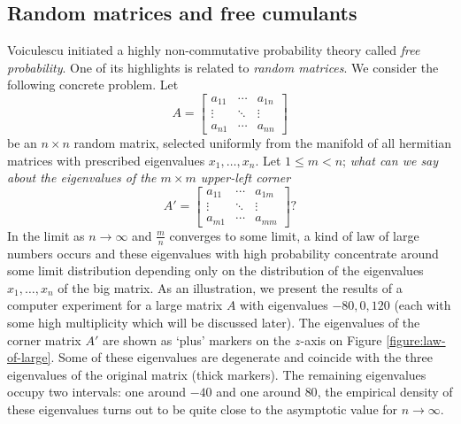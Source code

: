 \documentclass{emsprocart}
\theoremstyle{definition}
\begin{document}
\subsection{Random matrices and free cumulants}
\label{subsec:random-matrices}

Voiculescu initiated a highly non-commutative probability theory called \emph{free probability}.
One of its highlights is related to \emph{random matrices}.
We consider the following concrete problem.
Let 
$$ A = \begin{bmatrix} a_{11} & \cdots & a_{1n} \\
                       \vdots & \ddots & \vdots \\
                       a_{n1} & \cdots & a_{nn} 
       \end{bmatrix}$$ 
be an $n\times n$ random matrix, selected uniformly from the manifold of all hermitian matrices
with prescribed eigenvalues $x_1,\dots,x_n$. 
Let $1\leq m< n$; \emph{what can we say about the eigenvalues of the 
$m\times m$ upper-left corner}  
$$ A' = \begin{bmatrix} a_{11} & \cdots & a_{1m} \\
                       \vdots & \ddots & \vdots \\
                       a_{m1} & \cdots & a_{mm} 
       \end{bmatrix}?
$$
In the limit as $n\to\infty$ and $\frac{m}{n}$ converges to some limit, 
a kind of law of large numbers occurs and 
these eigenvalues with high probability concentrate around some limit distribution
depending only on the distribution of the eigenvalues $x_1,\dots,x_n$ of the big matrix.
As an illustration, we present the
results of a computer experiment for a large matrix $A$ 
with eigenvalues $-80,0,120$ (each with some high multiplicity which will be discussed later).
The eigenvalues of
the corner matrix $A'$ are shown as `plus' markers on the $z$-axis on Figure \ref{figure:law-of-large}. 
Some of these eigenvalues are degenerate and coincide with the three eigenvalues of the original matrix
(thick markers). 
The remaining eigenvalues occupy 
two intervals: one around $-40$ and one around $80$,
the empirical density of these eigenvalues turns out to be quite close to the asymptotic value for $n\to\infty$.
\end{document}
